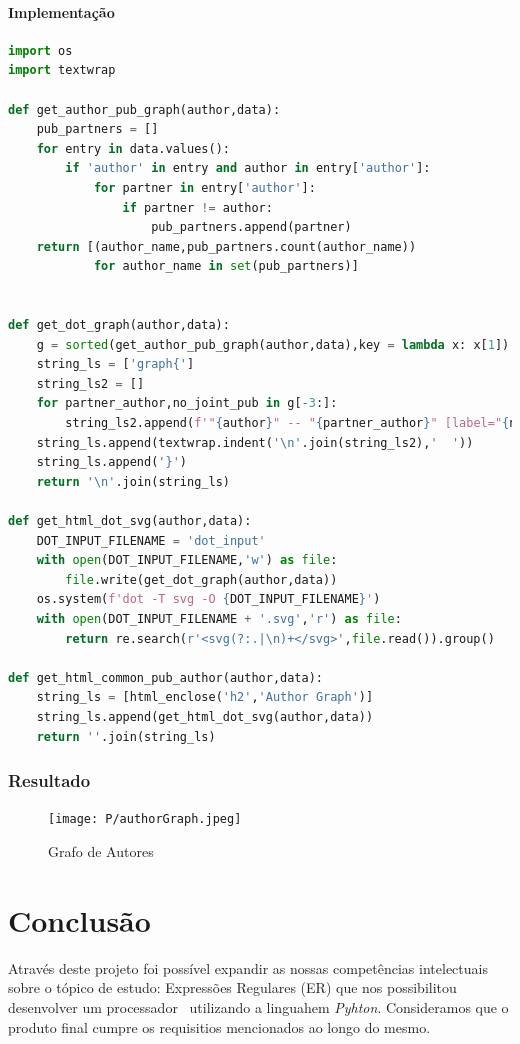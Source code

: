 \documentclass[11pt,a4paper]{report}
\begin{document}
\subsubsection{Implementação}
\begin{lstlisting}[language=python]
import os
import textwrap

def get_author_pub_graph(author,data):
    pub_partners = []
    for entry in data.values():
        if 'author' in entry and author in entry['author']:
            for partner in entry['author']:
                if partner != author:
                    pub_partners.append(partner)
    return [(author_name,pub_partners.count(author_name))
            for author_name in set(pub_partners)]


def get_dot_graph(author,data):
    g = sorted(get_author_pub_graph(author,data),key = lambda x: x[1])
    string_ls = ['graph{']
    string_ls2 = []
    for partner_author,no_joint_pub in g[-3:]:
        string_ls2.append(f'"{author}" -- "{partner_author}" [label="{no_joint_pub}"]')
    string_ls.append(textwrap.indent('\n'.join(string_ls2),'  '))
    string_ls.append('}')
    return '\n'.join(string_ls)

def get_html_dot_svg(author,data):
    DOT_INPUT_FILENAME = 'dot_input'
    with open(DOT_INPUT_FILENAME,'w') as file:
        file.write(get_dot_graph(author,data))
    os.system(f'dot -T svg -O {DOT_INPUT_FILENAME}')
    with open(DOT_INPUT_FILENAME + '.svg','r') as file:
        return re.search(r'<svg(?:.|\n)+</svg>',file.read()).group()

def get_html_common_pub_author(author,data):
    string_ls = [html_enclose('h2','Author Graph')]
    string_ls.append(get_html_dot_svg(author,data))
    return ''.join(string_ls)

\end{lstlisting}
\newpage
\subsection{Resultado}
\begin{figure}[h]
\centering
\texttt{[image: P/authorGraph.jpeg]}
\caption{Grafo de Autores}
\end{figure}


\chapter{Conclusão}

Através deste projeto foi possível expandir as nossas competências intelectuais sobre o tópico de estudo: Expressões Regulares (ER) que nos possibilitou desenvolver um processador \bib\ utilizando a linguahem \emph{Pyhton}.
Consideramos que o produto final cumpre os requisitios  mencionados ao longo do mesmo.
\end{document}
